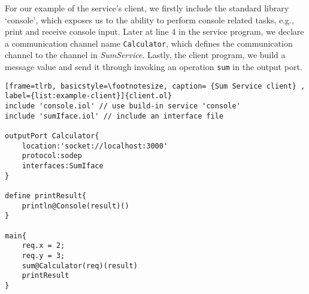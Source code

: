For our example of the service's client, we firstly include the standard library `console', which exposes us to the ability to perform console related tasks, e.g., print and receive console input. Later at line 4 in the service program, we declare a communication channel name \texttt{Calculator}, which defines the communication channel to the channel in \textit{SumService}. Lastly, the client program, we build a message value and send it through invoking an operation \texttt{sum} in the output port.

\begin{listing}[ht]
    \lstset{language=Jolie,
        style=codeStyle,
        numbers=left,
        firstnumber=1
    }
\begin{lstlisting}[frame=tlrb, basicstyle=\footnotesize, caption= {Sum Service client} , label={list:example-client}]{client.ol}
include 'console.iol' // use build-in service 'console'
include 'sumIface.iol' // include an interface file 

outputPort Calculator{
    location:'socket://localhost:3000'
    protocol:sodep 
    interfaces:SumIface
}

define printResult{
    println@Console(result)()
}

main{
    req.x = 2;
    req.y = 3;
    sum@Calculator(req)(result)
    printResult
}
\end{lstlisting}
\end{listing}

\FloatBarrier
